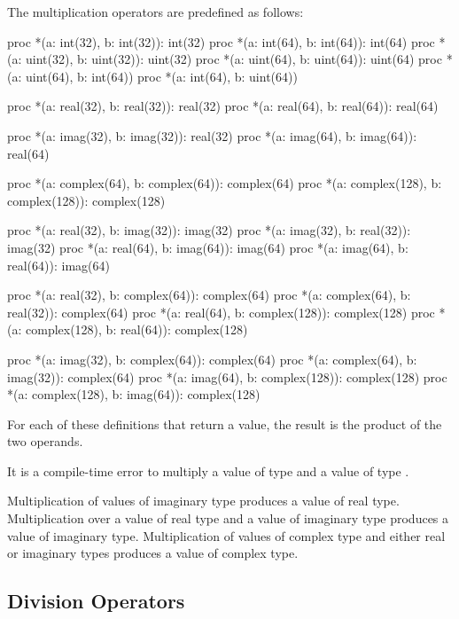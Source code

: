 The multiplication operators are predefined as follows:
\begin{chapel}
proc *(a: int(32), b: int(32)): int(32)
proc *(a: int(64), b: int(64)): int(64)
proc *(a: uint(32), b: uint(32)): uint(32)
proc *(a: uint(64), b: uint(64)): uint(64)
proc *(a: uint(64), b: int(64))
proc *(a: int(64), b: uint(64))

proc *(a: real(32), b: real(32)): real(32)
proc *(a: real(64), b: real(64)): real(64)

proc *(a: imag(32), b: imag(32)): real(32)
proc *(a: imag(64), b: imag(64)): real(64)

proc *(a: complex(64), b: complex(64)): complex(64)
proc *(a: complex(128), b: complex(128)): complex(128)

proc *(a: real(32), b: imag(32)): imag(32)
proc *(a: imag(32), b: real(32)): imag(32)
proc *(a: real(64), b: imag(64)): imag(64)
proc *(a: imag(64), b: real(64)): imag(64)

proc *(a: real(32), b: complex(64)): complex(64)
proc *(a: complex(64), b: real(32)): complex(64)
proc *(a: real(64), b: complex(128)): complex(128)
proc *(a: complex(128), b: real(64)): complex(128)

proc *(a: imag(32), b: complex(64)): complex(64)
proc *(a: complex(64), b: imag(32)): complex(64)
proc *(a: imag(64), b: complex(128)): complex(128)
proc *(a: complex(128), b: imag(64)): complex(128)
\end{chapel}
For each of these definitions that return a value, the result is the
product of the two operands.

It is a compile-time error to multiply a value of type  and
a value of type .

Multiplication of values of imaginary type produces a value of real
type.  Multiplication over a value of real type and a value of
imaginary type produces a value of imaginary type.  Multiplication of
values of complex type and either real or imaginary types produces a
value of complex type.

\subsection{Division Operators}
\label{Division_Operators}

